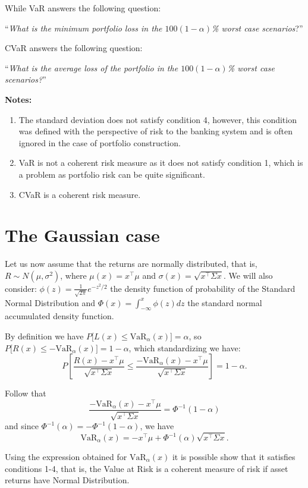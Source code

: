 While VaR answers the following question:

``\textit{What is the minimum portfolio loss in the $100(1-\alpha)$\% worst case scenarios}?''


CVaR answers the following question:

``\textit{What is the average loss of the portfolio in the $100(1-\alpha)$\% worst case scenarios?}''

\noindent
\parbox{\textwidth}{
\textbf{Notes:}
  \begin{enumerate}
\item The standard deviation does not satisfy condition 4, however, this condition was defined with the perspective of risk to the banking system and is often ignored in the case of portfolio construction.
\item VaR is not a coherent risk measure as it does not satisfy condition 1, which is a problem as portfolio risk can be quite significant.
\item CVaR is a coherent risk measure.
  \end{enumerate}
}

\section{The Gaussian case}

Let us now assume that the returns are normally distributed,
that is, $R\sim N(\mu,\sigma^2)$, where $\mu(x)=x^\top\mu$ and
$\sigma(x)=\sqrt{x^\top \Sigma x}$. We will also consider:
$\phi(z) = \frac{1}{\sqrt{2\pi}}e^{-z^2/2}$ the density function of
probability of the Standard Normal Distribution and $\Phi(x) = \int_{-\infty}^{x}\phi(z) dz$
the standard normal accumulated density function.

By definition we have
$P\Big[L(x)\leq \mbox{VaR}_\alpha(x)\Big]=\alpha$, so
$P\Big[R(x)\leq -\mbox{VaR}_\alpha(x)\Big]=1-\alpha$, which standardizing
we have: \[
P\left[ \frac{R(x)-x^\top\mu}{\sqrt{x^\top \Sigma x}} \leq \frac{-\mbox{VaR}_\alpha(x)- x^\top\mu}{\sqrt{x^\top \Sigma x}}
\right]=1-\alpha.
\]

Follow that \[
\frac{-\mbox{VaR}_\alpha(x)-x^\top\mu}{\sqrt{x^\top \Sigma x}}=\Phi^{-1}(1-\alpha)
\] and since $\Phi^{-1}(\alpha)=-\Phi^{-1}(1-\alpha)$, we have
\begin{equation}\label{eq:var2}
\mbox{VaR}_\alpha(x)=-x^\top\mu+ \Phi^{-1}(\alpha)\sqrt{x^\top \Sigma x}.
\end{equation}

Using the expression obtained for $\mbox{VaR}_\alpha(x)$ it is possible
show that it satisfies conditions 1-4, that is, the Value at Risk is
a coherent measure of risk if asset returns have
Normal Distribution.

